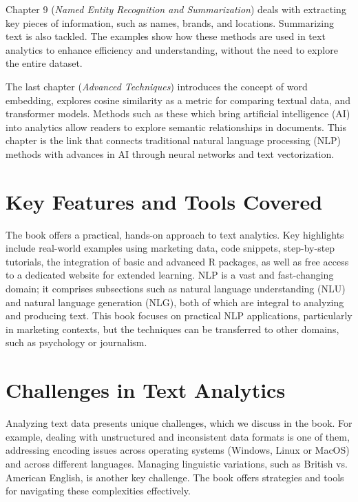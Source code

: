 Chapter 9 (\emph{Named Entity Recognition and Summarization}) deals with extracting key pieces of information, such as names, brands, and locations. Summarizing text is also tackled. The examples show how these methods are used in text analytics to enhance efficiency and understanding, without the need to explore the entire dataset.

The last chapter (\emph{Advanced Techniques}) introduces the concept of word embedding, explores cosine similarity as a metric for comparing textual data, and transformer models. Methods such as these which bring artificial intelligence (AI) into analytics allow readers to explore semantic relationships in documents. This chapter is the link that connects traditional natural language processing (NLP) methods with advances in AI through neural networks and text vectorization.

\section{Key Features and Tools
Covered}\label{key-features-and-tools-covered}

The book offers a practical, hands-on approach to text analytics. Key highlights include real-world examples using marketing data, code snippets, step-by-step tutorials, the integration of basic and advanced R packages, as well as free access to a dedicated website for extended learning. NLP is a vast and fast-changing domain; it comprises subsections such as natural language understanding (NLU) and natural language generation (NLG), both of which are integral to analyzing and producing text. This book focuses on practical NLP applications, particularly in marketing contexts, but the techniques can be transferred to other domains, such as psychology or journalism.

\section{Challenges in Text
Analytics}\label{challenges-in-text-analytics}

Analyzing text data presents unique challenges, which we discuss in the book. For example, dealing with unstructured and inconsistent data formats is one of them, addressing encoding issues across operating systems (Windows, Linux or MacOS) and across different languages. Managing linguistic variations, such as British vs. American English, is another key challenge. The book offers strategies and tools for navigating these complexities effectively.

